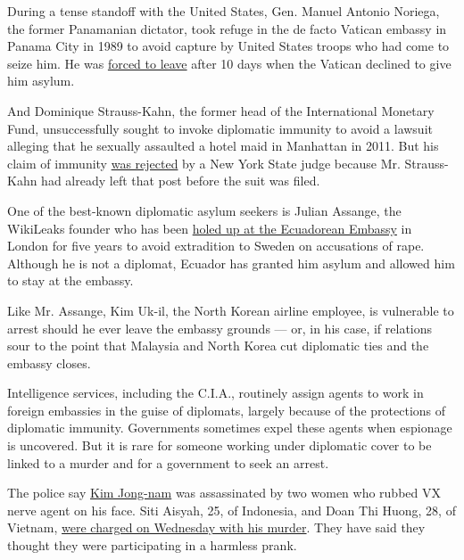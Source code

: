 During a tense standoff with the United States, Gen. Manuel Antonio
Noriega, the former Panamanian dictator, took refuge in the de facto
Vatican embassy in Panama City in 1989 to avoid capture by United States
troops who had come to seize him. He was
\href{http://www.nytimes.com/1990/01/05/world/noriega-s-surrender-chronology-vatican-issues-ultimatum-general-takes-walk.html?pagewanted=all.}{forced
to leave} after 10 days when the Vatican declined to give him asylum.

And Dominique Strauss-Kahn, the former head of the International
Monetary Fund, unsuccessfully sought to invoke diplomatic immunity to
avoid a lawsuit alleging that he sexually assaulted a hotel maid in
Manhattan in 2011. But his claim of immunity
\href{http://www.nytimes.com/2012/05/02/nyregion/strauss-kahns-claim-of-diplomatic-immunity-is-rejected.html}{was
rejected} by a New York State judge because Mr. Strauss-Kahn had already
left that post before the suit was filed.

One of the best-known diplomatic asylum seekers is Julian Assange, the
WikiLeaks founder who has been
\href{https://www.nytimes.com/2017/02/17/world/europe/julian-assange-ecuador-embassy.html}{holed
up at the Ecuadorean Embassy} in London for five years to avoid
extradition to Sweden on accusations of rape. Although he is not a
diplomat, Ecuador has granted him asylum and allowed him to stay at the
embassy.

Like Mr. Assange, Kim Uk-il, the North Korean airline employee, is
vulnerable to arrest should he ever leave the embassy grounds --- or, in
his case, if relations sour to the point that Malaysia and North Korea
cut diplomatic ties and the embassy closes.

Intelligence services, including the C.I.A., routinely assign agents to
work in foreign embassies in the guise of diplomats, largely because of
the protections of diplomatic immunity. Governments sometimes expel
these agents when espionage is uncovered. But it is rare for someone
working under diplomatic cover to be linked to a murder and for a
government to seek an arrest.

The police say
\href{https://www.nytimes.com/2017/02/15/world/asia/kim-jong-nam-assassination-north-korea.html}{Kim
Jong-nam} was assassinated by two women who rubbed VX nerve agent on his
face. Siti Aisyah, 25, of Indonesia, and Doan Thi Huong, 28, of Vietnam,
\href{https://www.nytimes.com/2017/02/28/world/asia/north-korea-kim-jong-nam-death.html}{were
charged on Wednesday with his murder}. They have said they thought they
were participating in a harmless prank.

